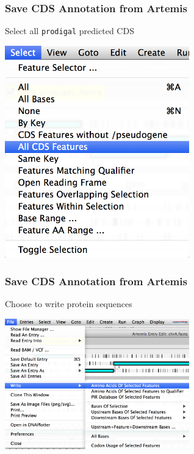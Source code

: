 \documentclass[table]{beamer}
\begin{document}
    \begin{frame}
      \frametitle{Save CDS Annotation from Artemis}   
      Select all \texttt{prodigal} predicted CDS
      \begin{center}
        \includegraphics[width=0.6\textwidth]{images/export1}     
      \end{center}        
    \end{frame}

    \begin{frame}
      \frametitle{Save CDS Annotation from Artemis}   
      Choose to write protein sequences
      \begin{center}
        \includegraphics[width=0.6\textwidth]{images/export2}     
      \end{center}        
    \end{frame}
\end{document}
